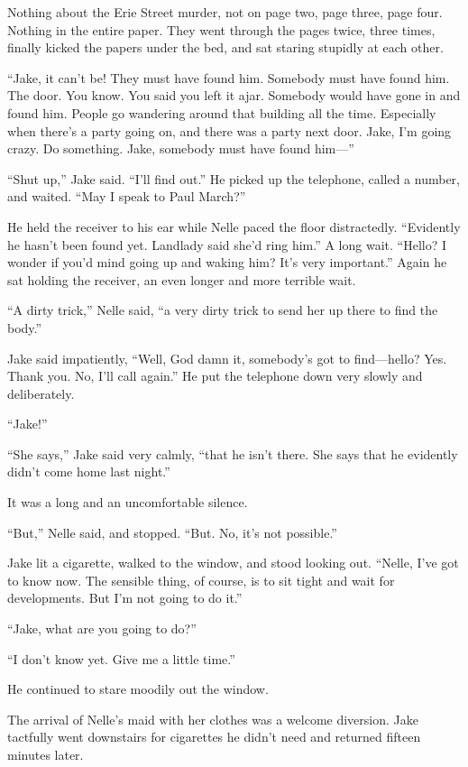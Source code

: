 \documentclass{novel}
\begin{document}
Nothing about the Erie Street murder, not on page two, page three, page four. Nothing in the entire paper. They went through the pages twice, three times, finally kicked the papers under the bed, and sat staring stupidly at each other.

“Jake, it can’t be! They must have found him. Somebody must have found him. The door. You know. You said you left it ajar. Somebody would have gone in and found him. People go wandering around that building all the time. Especially when there’s a party going on, and there was a party next door. Jake, I’m going crazy. Do something. Jake, somebody must have found him—”

“Shut up,” Jake said. “I'll find out.” He picked up the telephone, called a number, and waited. “May I speak to Paul March?”

He held the receiver to his ear while Nelle paced the floor distractedly. “Evidently he hasn’t been found yet. Landlady said she’d ring him.” A long wait. “Hello? I wonder if you’d mind going up and waking him? It’s very important.” Again he sat holding the receiver, an even longer and more terrible wait.

“A dirty trick,” Nelle said, “a very dirty trick to send her up there to find the body.”

Jake said impatiently, “Well, God damn it, somebody’s got to find—hello? Yes. Thank you. No, I'll call again.” He put the telephone down very slowly and deliberately.

“Jake!”

“She says,” Jake said very calmly, “that he isn’t there. She says that he evidently didn’t come home last night.”

It was a long and an uncomfortable silence.

“But,” Nelle said, and stopped. “But. No, it’s not possible.”

Jake lit a cigarette, walked to the window, and stood looking out. “Nelle, I’ve got to know now. The sensible thing, of course, is to sit tight and wait for developments. But I’m not going to do it.”

“Jake, what are you going to do?”

“I don’t know yet. Give me a little time.”

He continued to stare moodily out the window.

The arrival of Nelle’s maid with her clothes was a welcome diversion. Jake tactfully went downstairs for cigarettes he didn’t need and returned fifteen minutes later.
\end{document}
